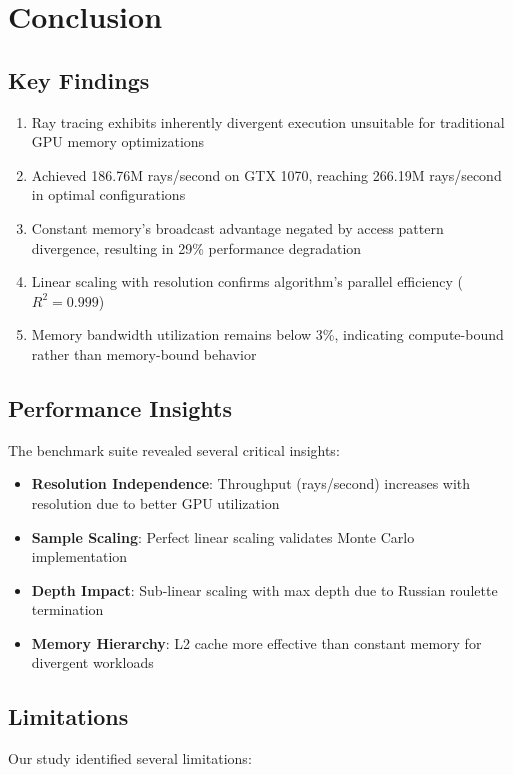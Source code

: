 \documentclass[conference]{IEEEtran}
\begin{document}
\section{Conclusion}

\subsection{Key Findings}
\begin{enumerate}
    \item Ray tracing exhibits inherently divergent execution unsuitable for traditional GPU memory optimizations
    \item Achieved 186.76M rays/second on GTX 1070, reaching 266.19M rays/second in optimal configurations
    \item Constant memory's broadcast advantage negated by access pattern divergence, resulting in 29\% performance degradation
    \item Linear scaling with resolution confirms algorithm's parallel efficiency ($R^2 = 0.999$)
    \item Memory bandwidth utilization remains below 3\%, indicating compute-bound rather than memory-bound behavior
\end{enumerate}

\subsection{Performance Insights}
The benchmark suite revealed several critical insights:
\begin{itemize}
    \item \textbf{Resolution Independence}: Throughput (rays/second) increases with resolution due to better GPU utilization
    \item \textbf{Sample Scaling}: Perfect linear scaling validates Monte Carlo implementation
    \item \textbf{Depth Impact}: Sub-linear scaling with max depth due to Russian roulette termination
    \item \textbf{Memory Hierarchy}: L2 cache more effective than constant memory for divergent workloads
\end{itemize}

\subsection{Limitations}
Our study identified several limitations:
\end{document}
